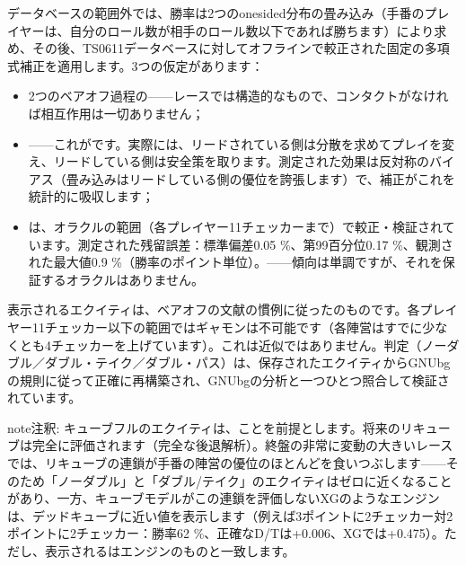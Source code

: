 \documentclass[letterpaper,10pt,dvipdfmx]{sphinxmanual}
\begin{document}
\sphinxAtStartPar
{} データベースの範囲外では、勝率は2つのone\sphinxhyphen{}sided分布の畳み込み（手番のプレイヤーは、自分のロール数が相手のロール数以下であれば勝ちます）により求め、その後、TS\sphinxhyphen{}06\sphinxhyphen{}11データベースに対してオフラインで較正された固定の多項式補正を適用します。3つの仮定があります：
\begin{itemize}
\item {} 
\sphinxAtStartPar
2つのベアオフ過程の——レースでは構造的なもので、コンタクトがなければ相互作用は一切ありません；

\item {} 
\sphinxAtStartPar
{}——これがです。実際には、リードされている側は分散を求めてプレイを変え、リードしている側は安全策を取ります。測定された効果は反対称のバイアス（畳み込みはリードしている側の優位を誇張します）で、補正がこれを統計的に吸収します；

\item {} 
\sphinxAtStartPar
{}は、オラクルの範囲（各プレイヤー11チェッカーまで）で較正・検証されています。測定された残留誤差：標準偏差0.05 \%、第99百分位0.17 \%、観測された最大値0.9 \%（勝率のポイント単位）。——傾向は単調ですが、それを保証するオラクルはありません。

\end{itemize}

\sphinxAtStartPar
{} 表示されるエクイティは、ベアオフの文献の慣例に従ったのものです。各プレイヤー11チェッカー以下の範囲ではギャモンは不可能です（各陣営はすでに少なくとも4チェッカーを上げています）。これは近似ではありません。判定（ノーダブル／ダブル・テイク／ダブル・パス）は、保存されたエクイティからGNUbgの規則に従って正確に再構築され、GNUbgの分析と一つひとつ照合して検証されています。

\begin{sphinxadmonition}{note}{注釈:}
\sphinxAtStartPar
キューブフルのエクイティは、ことを前提とします。将来のリキューブは完全に評価されます（完全な後退解析）。終盤の非常に変動の大きいレースでは、リキューブの連鎖が手番の陣営の優位のほとんどを食いつぶします——そのため「ノーダブル」と「ダブル/テイク」のエクイティはゼロに近くなることがあり、一方、キューブモデルがこの連鎖を評価しないXGのようなエンジンは、デッドキューブに近い値を表示します（例えば3ポイントに2チェッカー対2ポイントに2チェッカー：勝率62 \%、正確なD/Tは+0.006、XGでは+0.475）。ただし、表示されるはエンジンのものと一致します。
\end{sphinxadmonition}
\end{document}
